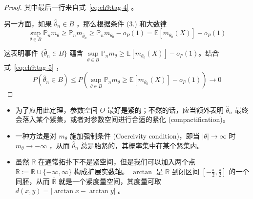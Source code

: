 \begin{proof}
其中最后一行来自式~\eqref{eq:ch9:tag-4} 。

另一方面，如果 $\widehat\theta_n\in B$ ，那么根据条件 (3.) 和大数律\[ \sup_{\theta \in B} \mathbb{P}_n m_\theta \geq \mathbb{P}_n m_{\widehat{\theta}_n} \geq \mathbb{P}_n m_{\theta_0} - o_P(1) = \mathbb{E}[m_{\theta_0}(X)]-o_P(1) \]

这表明事件 $\{\widehat{\theta}_n \in B\}$ 蕴含 $\sup\limits_{\theta\in B} \mathbb{P}_n m_\theta \ge \mathbb{E}[m_{\theta_0}(X)] - o_P(1)$。结合式~\eqref{eq:ch9:tag-5} ，\[P(\widehat\theta_n\in B)\le P\left(\sup_{\theta\in B}\mathbb P_nm_\theta\ge\mathbb E[m_{\theta_0}(X)]-o_P(1)\right)\to 0\]
\end{proof}

\begin{remark}

\begin{itemize}
\tightlist
\item
  为了应用此定理，参数空间 $\Theta$ 最好是紧的；不然的话，应当额外表明 $\widehat\theta_n$ 最终会落入某个紧集，或者对参数空间进行合适的紧化 (compactification)。
\item
  一种方法是对 $m_\theta$ 施加强制条件 (Coercivity condition)，即当 $|\theta|\to\infty$ 时 $m_\theta\to -\infty$ ，从而 $\widehat\theta_n$ 总是胎紧的，其概率集中在某个紧集内。
\item
  虽然 $\mathbb R$ 在通常拓扑下不是紧空间，但是我们可以加入两个点 $\overline{\mathbb R}:=\mathbb R\cup\{-\infty,\infty\}$ 构成扩展实数轴。 $\arctan$ 是 $\overline{\mathbb R}$ 到闭区间 $\left[-\tfrac\pi2,\tfrac\pi2\right]$ 的一个同胚，从而 $\overline{\mathbb R}$ 就是一个紧度量空间，其度量可取 $d(x,y)=|\arctan x-\arctan y|$ 。
\end{itemize}
\end{remark}

